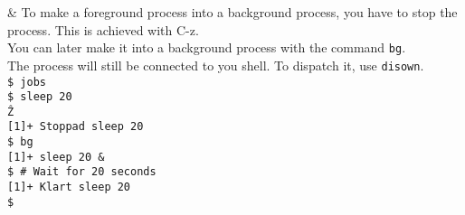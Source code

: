 \documentclass{beamer}
\let\tt\texttt
\begin{document}
\begin{frame}{\&}
        To make a foreground process into a background process, you have to stop the process. This is achieved with C-z. \\
        You can later make it into a background process with the command \tt{bg}.   \\
        The process will still be connected to you shell. To dispatch it, use \tt{disown}. \\
        \tt{\$ jobs}                    \\
        \tt{\$ sleep 20}                \\
        \tt{\^Z}                        \\
        \tt{[1]+  Stoppad   sleep 20}   \\
        \tt{\$ bg}                      \\
        \tt{[1]+ sleep 20 {\&}}         \\
        \tt{\$ \# Wait for 20 seconds }  \\
        \tt{[1]+  Klart     sleep 20}   \\
        \tt{\$ }                        \\
\end{frame}
\end{document}
